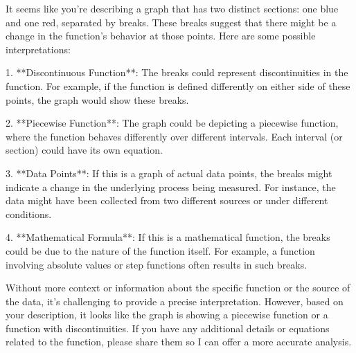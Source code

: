 It seems like you're describing a graph that has two distinct sections: one blue and one red, separated by breaks. These breaks suggest that there might be a change in the function's behavior at those points. Here are some possible interpretations:

1. **Discontinuous Function**: The breaks could represent discontinuities in the function. For example, if the function is defined differently on either side of these points, the graph would show these breaks.

2. **Piecewise Function**: The graph could be depicting a piecewise function, where the function behaves differently over different intervals. Each interval (or section) could have its own equation.

3. **Data Points**: If this is a graph of actual data points, the breaks might indicate a change in the underlying process being measured. For instance, the data might have been collected from two different sources or under different conditions.

4. **Mathematical Formula**: If this is a mathematical function, the breaks could be due to the nature of the function itself. For example, a function involving absolute values or step functions often results in such breaks.

Without more context or information about the specific function or the source of the data, it's challenging to provide a precise interpretation. However, based on your description, it looks like the graph is showing a piecewise function or a function with discontinuities. If you have any additional details or equations related to the function, please share them so I can offer a more accurate analysis.